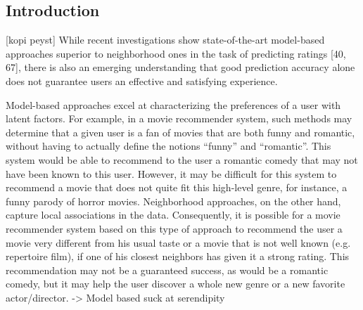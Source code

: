 \subsection{Introduction}
[kopi peyst]
While recent investigations show state-of-the-art model-based approaches superior to neighborhood ones in the task of predicting ratings [40, 67], there is also an emerging understanding that good prediction accuracy alone does not guarantee users an effective and satisfying experience.

Model-based approaches excel at characterizing the preferences of a user with latent factors. For example, in a movie recommender system, such methods may determine that a given user is a fan of movies that are both funny and romantic, without having to actually define the notions “funny” and “romantic”. This system would be able to recommend to the user a romantic comedy that may not have been known to this user. However, it may be difficult for this system to recommend a movie that does not quite fit this high-level genre, for instance, a funny parody of horror movies. Neighborhood approaches, on the other hand, capture local associations in the data. Consequently, it is possible for a movie recommender system based on this type of approach to recommend the user a movie very different from his usual taste or a movie that is not well known (e.g. repertoire film), if one of his closest neighbors has given it a strong rating. This recommendation may not be a guaranteed success, as would be a romantic comedy, but it may help the user discover a whole new genre or a new favorite actor/director. -> Model based suck at serendipity

